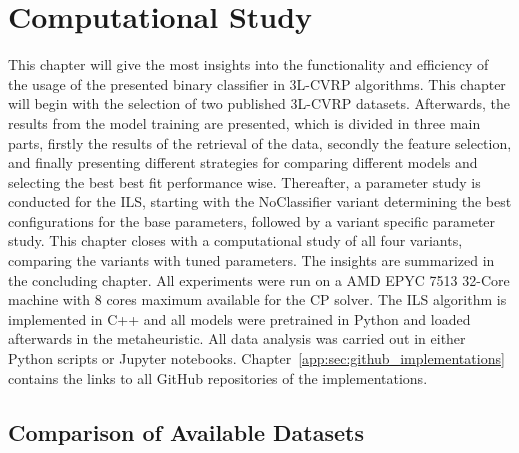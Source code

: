 \chapter{Computational Study}
\label{chap:computational_study}
This chapter will give the most insights into the functionality and efficiency of the usage of the presented binary classifier in
\gls{3L-CVRP} algorithms. This chapter will begin with the selection of two published \gls{3L-CVRP} datasets.
Afterwards, the results from the model training are presented, which
is divided in three main parts, firstly the results of the retrieval of the data, secondly the feature selection, and finally presenting
different strategies for comparing different models and selecting the best best fit performance wise.
Thereafter, a parameter study is conducted for the \gls{ILS}, starting with the NoClassifier variant determining
the best configurations for the base parameters, followed by a variant specific parameter study.
This chapter closes with a computational study of all four variants, comparing the variants with tuned parameters.
The insights are summarized in the concluding chapter. All experiments were run on a AMD EPYC 7513 32-Core machine
with 8 cores maximum available for the \gls{CP} solver. The \gls{ILS} algorithm is implemented in C++ and all models
were pretrained in Python and loaded afterwards in the metaheuristic. All data analysis was carried out in either Python scripts
or Jupyter notebooks. Chapter~\ref{app:sec:github_implementations} contains the links to all GitHub repositories of the implementations.

\section{Comparison of Available Datasets}
\label{sec:dataset_comparison}

